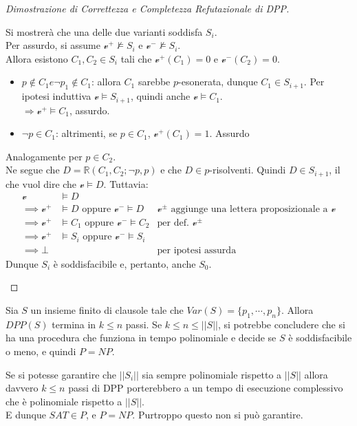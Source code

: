 \begin{proof}[Dimostrazione di  Correttezza e Completezza Refutazionale di DPP]
\begin{itemize}
  Si mostrerà che una delle due varianti soddisfa $S_i$. \\
  Per assurdo, si assume $\mathcal{v}^+ \nvDash S_i$ e $\mathcal{v}^- \nvDash S_i$. \\
  Allora esistono $C_1, C_2 \in S_i$ tali che $\mathcal{v}^+(C_1) = 0$ e $\mathcal{v}^-(C_2) = 0$.
  \begin{itemize}
    \item $p \notin C_1 e \neg p_1 \notin C_1$: allora $C_1$ sarebbe $p$-esonerata, dunque $C_1 \in S_{i+1}$. Per ipotesi induttiva $\mathcal{v} \models S_{i+1}$, quindi anche $\mathcal{v} \models C_1$. \\
    $\Rightarrow \mathcal{v}^+ \models C_1$, assurdo.
    \item $\neg p \in C_1$: altrimenti, se $p \in C_1$, $\mathcal{v}^+(C_1) = 1$. Assurdo
  \end{itemize}
  Analogamente per $p \in C_2$. \\
  Ne segue che $D = \mathbb{R}(C_1, C_2; \neg p, p)$ e che $D \in p$-risolventi. Quindi $D \in S_{i+1}$, il che vuol dire che $\mathcal{v} \models D$. Tuttavia:
  \begin{align*}
    \mathcal{v} & \models D \\
    \implies \mathcal{v}^+ & \models D \text{ oppure } \mathcal{v}^- \models D & \mathcal{v}^\pm \text{ aggiunge una lettera proposizionale a } \mathcal{v} \\
    \implies \mathcal{v}^+ & \models C_1 \text{ oppure } \mathcal{v}^- \models C_2 & \text{per def. }\mathcal{v}^\pm \\
    \implies \mathcal{v}^+ & \models S_i \text{ oppure } \mathcal{v}^- \models S_i \\
    \implies \bot && \text{per ipotesi assurda}
  \end{align*}
  Dunque $S_i$ è soddisfacibile e, pertanto, anche  $S_0$.
\end{itemize}
\end{proof}

\begin{oss}
Sia $S$ un insieme finito di clausole tale che $Var(S) = \{p_1, \cdots, p_n\}$. 
Allora $DPP(S)$ termina in $k \leq n$ passi. Se $k \leq n \leq ||S||$, si potrebbe concludere che si ha una procedura che funziona in tempo 
polinomiale e decide se $S$ è soddisfacibile o meno, e quindi $P = NP$. 
\end{oss}

Se si potesse garantire che $||S_i||$ sia sempre polinomiale rispetto a $||S||$ allora davvero $k \leq n$ passi di DPP porterebbero a un tempo di esecuzione complessivo che è polinomiale rispetto a $||S||$. \\
E dunque $SAT \in P$, e $P = NP$. Purtroppo questo non si può garantire.

